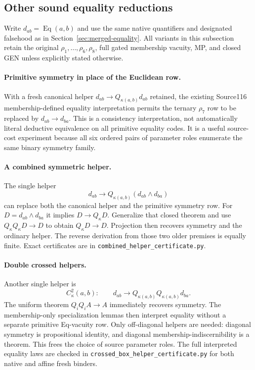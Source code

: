 \subsection{Other sound equality reductions}

Write $d_{ab}=\operatorname{Eq}(a,b)$ and use the same native quantifiers
and designated falsehood as in Section~\ref{sec:merged-equality}.
All variants in this subsection retain the original
$\rho_1,\ldots,\rho_6,\rho_8$, full gated membership vacuity, MP, and
closed GEN unless explicitly stated otherwise.

\paragraph{Primitive symmetry in place of the Euclidean row.}
With a fresh canonical helper $d_{ab}\to Q_{\kappa(a,b)}d_{ab}$ retained,
the existing Source116 membership-defined equality interpretation permits
the ternary $\rho_7$ row to be replaced by $d_{ab}\to d_{ba}$.  This is a
consistency interpretation, not automatically literal deductive
equivalence on all primitive equality codes.  It is a useful source-cost
experiment because all six ordered pairs of parameter roles enumerate
the same binary symmetry family.

\paragraph{A combined symmetric helper.}
The single helper
\[
 d_{ab}\longrightarrow
 Q_{\kappa(a,b)}(d_{ab}\wedge d_{ba})
\]
can replace both the canonical helper and the primitive symmetry row.
For $D=d_{ab}\wedge d_{ba}$ it implies $D\to Q_\kappa D$.
Generalize that closed theorem and use
$Q_\kappa Q_\kappa D\to D$ to obtain $Q_\kappa D\to D$.
Projection then recovers symmetry and the ordinary helper.  The reverse
derivation from those two older premises is equally finite.  Exact
certificates are in \texttt{combined\_helper\_certificate.py}.

\paragraph{Double crossed helpers.}
Another single helper is
\[
 C^2_\kappa(a,b):\qquad
 d_{ab}\longrightarrow Q_{\kappa(a,b)}Q_{\kappa(a,b)}d_{ba}.
\]
The uniform theorem $Q_iQ_iA\to A$ immediately recovers symmetry.  The
membership-only specialization lemmas then interpret equality without a
separate primitive Eq-vacuity row.  Only off-diagonal helpers are needed:
diagonal symmetry is propositional identity, and diagonal
membership-indiscernibility is a theorem.  This frees the choice of
source parameter roles.  The full interpreted equality laws are checked
in \texttt{crossed\_box\_helper\_certificate.py} for both native and
affine fresh binders.


